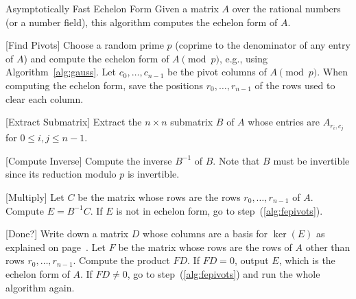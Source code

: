 \begin{algorithm}{Asymptotically Fast Echelon Form}\label{alg:fe}
  Given a matrix $A$ over the rational numbers (or a number field),
  this algorithm computes the echelon form of $A$.
\begin{steps}
\item{}[Find Pivots]\label{alg:fepivots} Choose a random prime $p$ (coprime to the
  denominator of any entry of $A$) and compute the echelon form of
  $A\pmod{p}$, e.g., using Algorithm~\ref{alg:gauss}.  Let $c_0, \ldots,
  c_{n-1}$ be the pivot columns of $A\pmod{p}$.  When computing the
  echelon form, save the positions $r_0,\ldots, r_{n-1}$ of the rows
  used to clear each column. 
\item{}[Extract Submatrix] Extract the $n\times n$ submatrix
  $B$ of $A$ whose entries are $A_{r_i,c_j}$ for $0\leq i,j \leq {n-1}$.
\item{}[Compute Inverse] 
  Compute the inverse $B^{-1}$ of $B$.  Note that $B$ must be
  invertible since its reduction modulo $p$ is invertible.
\item{}[Multiply] Let $C$ be the matrix whose rows are the
rows $r_0,\ldots, r_{n-1}$ of $A$.   Compute $E=B^{-1}C$.
If $E$ is not in echelon form, go to step~(\ref{alg:fepivots}).
\item{}[Done?]\label{alg:fedone} 
 Write down a matrix $D$ whose columns are a basis for
  $\ker(E)$ as explained on page~\pageref{alg:ker}.  Let $F$ be the
  matrix whose rows are the rows of $A$ other than rows $r_0,\ldots,
  r_{n-1}$.  Compute the product $FD$.  If $FD=0$, output $E$, which is
  the echelon form of $A$.  If $FD\neq 0$, go to
  step~(\ref{alg:fepivots}) and run the whole algorithm again.
\end{steps}
\end{algorithm}

